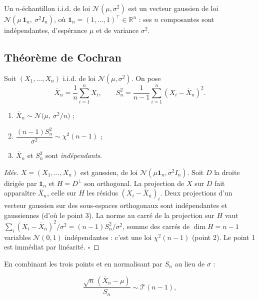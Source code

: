 \begin{remarque}
Un $n$-échantillon i.i.d. de loi $\mathcal N(\mu,\sigma^2)$ est un vecteur gaussien de loi $\mathcal N(\mu\,\mathbf 1_n,\ \sigma^2 I_n)$, où $\mathbf 1_n = (1,\dots,1)^\top \in \mathbb R^n$ : ses $n$ composantes sont indépendantes, d'espérance $\mu$ et de variance $\sigma^2$.
\end{remarque}

\subsection{Théorème de Cochran}

Soit $(X_1,\dots,X_n)$ i.i.d. de loi $\mathcal N(\mu,\sigma^2)$. On pose
$$
\overline X_n = \frac{1}{n}\sum_{i=1}^n X_i,
\qquad
S_n^2 = \frac{1}{n-1}\sum_{i=1}^n (X_i - \overline X_n)^2.
$$

\medskip

\begin{mdframed}
\begin{theoreme}[Cochran]
\begin{enumerate}
\item $\overline X_n \sim \mathcal N\!\big(\mu,\ \sigma^2/n\big)$ ;
\item $\dfrac{(n-1)S_n^2}{\sigma^2} \sim \chi^2(n-1)$ ;
\item $\overline X_n$ et $S_n^2$ sont \textit{indépendants}.
\end{enumerate}
\end{theoreme}
\end{mdframed}

\begin{proof}[Idée]
$X = (X_1,\dots,X_n)$ est gaussien, de loi $\mathcal N(\mu\mathbf 1_n,\sigma^2 I_n)$. Soit $D$ la droite dirigée par $\mathbf 1_n$ et $H = D^\perp$ son orthogonal. La projection de $X$ sur $D$ fait apparaître $\overline X_n$, celle sur $H$ les résidus $(X_i - \overline X_n)_i$. Deux projections d'un vecteur gaussien sur des sous-espaces orthogonaux sont indépendantes et gaussiennes (d'où le point 3). La norme au carré de la projection sur $H$ vaut $\sum_i (X_i - \overline X_n)^2/\sigma^2 = (n-1)S_n^2/\sigma^2$, somme des carrés de $\dim H = n-1$ variables $\mathcal N(0,1)$ indépendantes : c'est une loi $\chi^2(n-1)$ (point 2). Le point 1 est immédiat par linéarité. $\square$
\end{proof}

\medskip

\begin{mdframed}
\begin{corollaire}
En combinant les trois points et en normalisant par $S_n$ au lieu de $\sigma$ :

$$
\frac{\sqrt n\,(\overline X_n - \mu)}{S_n} \sim \mathcal T(n-1),
$$
\end{corollaire}
\end{mdframed}

